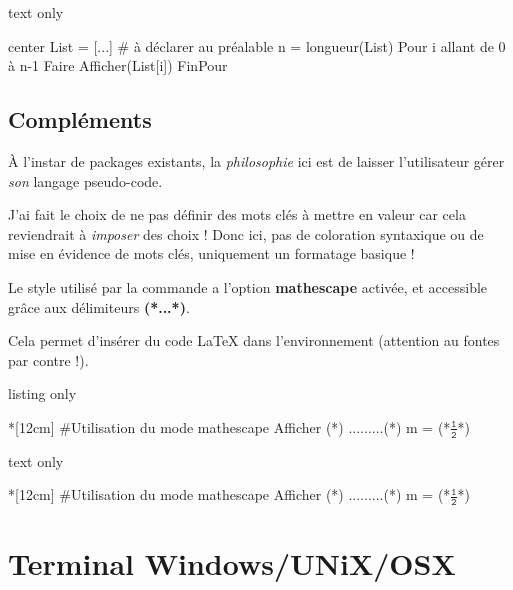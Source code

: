 \documentclass[a4paper,french,11pt]{article}
\newcommand\ctex[1]{\tcbox[vignettelatex]{#1}}
\newcommand\Cle[1]{{\bfseries\sffamily\textlangle #1\textrangle}}
\begin{document}
\begin{PresCodeSortiePL}{text only}
\begin{PseudoCodeAlt}[15cm]{center}
List = [...]          # à déclarer au préalable
n = longueur(List)
Pour i allant de 0 à n-1 Faire
	Afficher(List[i])
FinPour
\end{PseudoCodeAlt}
\end{PresCodeSortiePL}

\subsection{Compléments}

\begin{warningblock}
À l'instar de packages existants, la \textit{philosophie} ici est de laisser l'utilisateur gérer \textit{son} langage pseudo-code.

J'ai fait le choix de ne pas définir des \textsf{mots clés} à mettre en valeur car cela reviendrait à \textit{imposer} des choix ! Donc ici, pas de coloration syntaxique ou de mise en évidence de mots clés, uniquement un formatage basique !
\end{warningblock}

\begin{noteblock}
Le style \ctex{listings} utilisé par la commande a l'option \Cle{mathescape} activée, et accessible grâce aux délimiteurs \Cle{(*...*)}.

Cela permet d'insérer du code \LaTeX{} dans l'environnement \ctex{PseudoCode} (attention au fontes par contre !).
\end{noteblock}

\begin{PresCodeTexPL}{listing only}
\begin{PseudoCode}*[12cm]{}
#Utilisation du mode mathescape
Afficher (*\og*) .........(*\fg*)
m = (*$\tfrac{\texttt{1}}{\texttt{2}}$*)
\end{PseudoCode}
\end{PresCodeTexPL}

\begin{PresCodeSortiePL}{text only}
\begin{PseudoCode}*[12cm]{}
#Utilisation du mode mathescape
Afficher (*\og*) .........(*\fg*)
m = (*$\tfrac{\texttt{1}}{\texttt{2}}$*)
\end{PseudoCode}
\end{PresCodeSortiePL}

\newpage

\section{Terminal Windows/UNiX/OSX}\label{terms}
\end{document}
